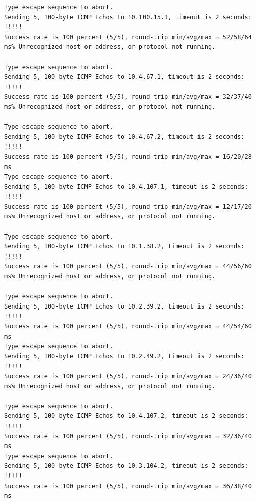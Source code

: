 \documentclass[12pt,twoside,a4paper]{article}
\begin{document}
{\begin{small}
\begin{verbatim}
Type escape sequence to abort.
Sending 5, 100-byte ICMP Echos to 10.100.15.1, timeout is 2 seconds:
!!!!!
Success rate is 100 percent (5/5), round-trip min/avg/max = 52/58/64 ms% Unrecognized host or address, or protocol not running.

Type escape sequence to abort.
Sending 5, 100-byte ICMP Echos to 10.4.67.1, timeout is 2 seconds:
!!!!!
Success rate is 100 percent (5/5), round-trip min/avg/max = 32/37/40 ms% Unrecognized host or address, or protocol not running.

Type escape sequence to abort.
Sending 5, 100-byte ICMP Echos to 10.4.67.2, timeout is 2 seconds:
!!!!!
Success rate is 100 percent (5/5), round-trip min/avg/max = 16/20/28 ms
Type escape sequence to abort.
Sending 5, 100-byte ICMP Echos to 10.4.107.1, timeout is 2 seconds:
!!!!!
Success rate is 100 percent (5/5), round-trip min/avg/max = 12/17/20 ms% Unrecognized host or address, or protocol not running.

Type escape sequence to abort.
Sending 5, 100-byte ICMP Echos to 10.1.38.2, timeout is 2 seconds:
!!!!!
Success rate is 100 percent (5/5), round-trip min/avg/max = 44/56/60 ms% Unrecognized host or address, or protocol not running.

Type escape sequence to abort.
Sending 5, 100-byte ICMP Echos to 10.2.39.2, timeout is 2 seconds:
!!!!!
Success rate is 100 percent (5/5), round-trip min/avg/max = 44/54/60 ms
Type escape sequence to abort.
Sending 5, 100-byte ICMP Echos to 10.2.49.2, timeout is 2 seconds:
!!!!!
Success rate is 100 percent (5/5), round-trip min/avg/max = 24/36/40 ms% Unrecognized host or address, or protocol not running.

Type escape sequence to abort.
Sending 5, 100-byte ICMP Echos to 10.4.107.2, timeout is 2 seconds:
!!!!!
Success rate is 100 percent (5/5), round-trip min/avg/max = 32/36/40 ms
Type escape sequence to abort.
Sending 5, 100-byte ICMP Echos to 10.3.104.2, timeout is 2 seconds:
!!!!!
Success rate is 100 percent (5/5), round-trip min/avg/max = 36/38/40 ms

\end{verbatim}
\end{small}
}
\end{document}
